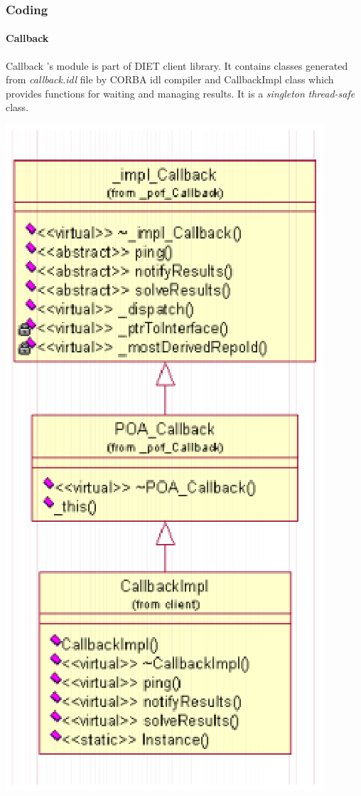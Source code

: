   \subsubsection{Coding}
  \paragraph{Callback}
  Callback 's module is part of DIET client library. It contains classes generated
  from \emph{callback.idl} file by CORBA idl compiler and CallbackImpl class
  which provides functions for waiting and managing results. It is a \emph{singleton}
  \emph{thread-safe} class.

  \includegraphics{./fig/CorbaClientClassDIagram.ps}

